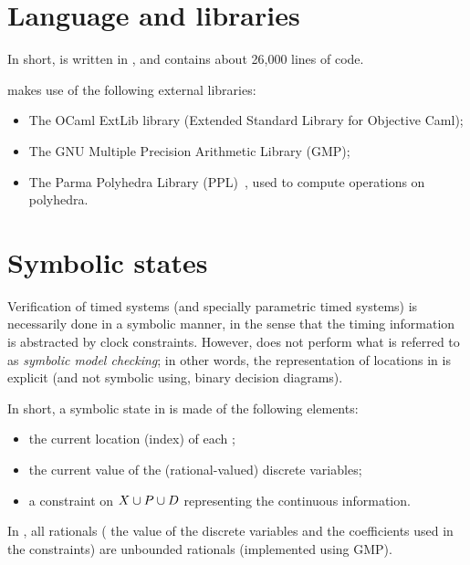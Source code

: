 \section{Language and libraries}

In short, \imitator{} is written in \ocaml{}, and contains about 26,000 lines of code.

\imitator{} makes use of the following external libraries:

\begin{itemize}
	\item The OCaml ExtLib library (Extended Standard Library for Objective Caml);
	\item The GNU Multiple Precision Arithmetic Library (GMP);
	\item The Parma Polyhedra Library (PPL)~\cite{BHZ08}, used to compute operations on polyhedra.
\end{itemize}


\section{Symbolic states}

Verification of timed systems (and specially parametric timed systems) is necessarily done in a symbolic manner, in the sense that the timing information is abstracted by clock constraints.
However, \imitator{} does not perform what is referred to as \emph{symbolic model checking}; in other words, the representation of locations in \imitator{} is explicit (and not symbolic using, \eg{} binary decision diagrams).


In short, a symbolic state in \imitator{} is made of the following elements:
\begin{itemize}
	\item the current location (index) of each \IPTA{};
	\item the current value of the (rational-valued) discrete variables;
	\item a constraint on $X \cup P \cup D$ representing the continuous information.
\end{itemize}
In \imitator{}, all rationals (\ie{} the value of the discrete variables and the coefficients used in the constraints) are unbounded rationals (implemented using GMP).



